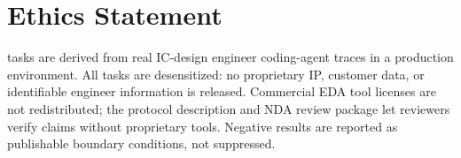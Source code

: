 \section{Ethics Statement}
\label{sec:ethics}

\bench{} tasks are derived from real IC-design engineer coding-agent traces in a production environment. All tasks are desensitized: no proprietary IP, customer data, or identifiable engineer information is released. Commercial EDA tool licenses are not redistributed; the protocol description and NDA review package let reviewers verify claims without proprietary tools. Negative results are reported as publishable boundary conditions, not suppressed.
